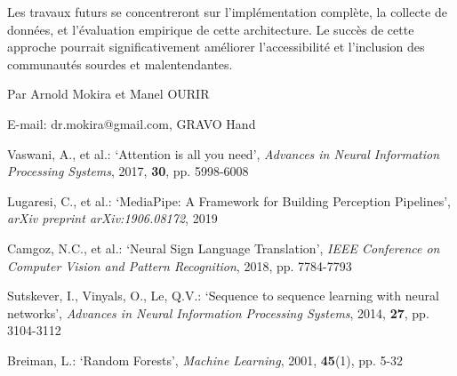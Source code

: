 \documentclass[twocolumn]{el-author}
\begin{document}
Les travaux futurs se concentreront sur l'implémentation complète, la collecte de données, et l'évaluation empirique de cette architecture. Le succès de cette approche pourrait significativement améliorer l'accessibilité et l'inclusion des communautés sourdes et malentendantes.

\vskip3pt

\vskip5pt

\noindent Par Arnold Mokira et Manel OURIR 
\vskip3pt

\noindent E-mail: dr.mokira@gmail.com, GRAVO Hand

\begin{thebibliography}{}

Vaswani, A., et al.: `Attention is all you need', \textit{Advances in Neural Information Processing Systems}, 2017, \textbf{30}, pp. 5998-6008

Lugaresi, C., et al.: `MediaPipe: A Framework for Building Perception Pipelines', \textit{arXiv preprint arXiv:1906.08172}, 2019

Camgoz, N.C., et al.: `Neural Sign Language Translation', \textit{IEEE Conference on Computer Vision and Pattern Recognition}, 2018, pp. 7784-7793

Sutskever, I., Vinyals, O., Le, Q.V.: `Sequence to sequence learning with neural networks', \textit{Advances in Neural Information Processing Systems}, 2014, \textbf{27}, pp. 3104-3112

Breiman, L.: `Random Forests', \textit{Machine Learning}, 2001, \textbf{45}(1), pp. 5-32

\end{thebibliography}
\end{document}
